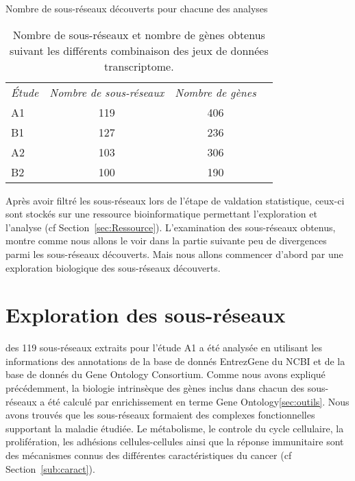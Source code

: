 		\begin{table}
			\begin{center}
				\caption{Nombre de sous-réseaux découverts pour chacune des analyses}
				\begin{tabular}{lccc}
					\toprule
					\multirow{2}{2cm}{\emph{Étude}} & \multirow{2}{3cm}{\centering\emph{Nombre de sous-réseaux}} & \multirow{2}{3cm}{\centering\emph{Nombre de gènes}} \\
					&&\\
					\midrule
					A1	&	119	&	406	\\
					B1	&	127	&	236	\\
					A2	&	103	&	306	\\
					B2	&	100	&	190	\\
					\bottomrule
				\end{tabular}
				\label{tab:Res1Networks}
				\vspace{5ex}
				\caption*{Nombre de sous-réseaux et nombre de gènes obtenus suivant les différents combinaison des jeux de données transcriptome.}
			\end{center}
		\end{table}

		Après avoir filtré les sous-réseaux lors de l'étape de valdation statistique, ceux-ci sont stockés sur une ressource bioinformatique permettant l'exploration et l'analyse (cf Section~\ref{sec:Ressource}).
		L'examination des sous-réseaux obtenus, montre comme nous allons le voir dans la partie suivante peu de divergences parmi les sous-réseaux découverts.
		Mais nous allons commencer d'abord par une exploration biologique des sous-réseaux découverts.

	\section{\textcolor{green!45!black}{Exploration des sous-réseaux}}\label{sec:Exploration}
		 des 119 sous-réseaux extraits pour l'étude A1 a été analysée en utilisant les informations des annotations de la base de donnés EntrezGene du NCBI et de la base de donnés du Gene Ontology Consortium.
		Comme nous avons expliqué précédemment, la biologie intrinsèque des gènes inclus dans chacun des sous-réseaux a été calculé par enrichissement en terme Gene Ontology\ref{sec:outils}.
		Nous avons trouvés que les sous-réseaux formaient des complexes fonctionnelles supportant la maladie étudiée.
		Le métabolisme, le controle du cycle cellulaire, la prolifération, les adhésions cellules-cellules ainsi que la réponse immunitaire sont des mécanismes connus des différentes caractéristiques du cancer (cf Section~\ref{sub:caract}).

